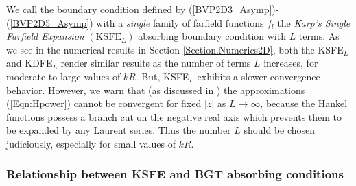 \documentclass[final,3p,times,12pt]{elsarticle}
\begin{document}
We call the boundary condition defined by (\ref{BVP2D3_Asymp})-(\ref{BVP2D5_Asymp}) with a \textit{single} family of farfield functions $f_{l}$ the \textit{Karp's Single Farfield Expansion} $(\text{KSFE}_{L})$ absorbing boundary condition with $L$ terms. As we see in the numerical results in Section \ref{Section.Numerics2D}, both the KSFE$_{L}$ and KDFE$_{L}$ render similar results  as the number of terms $L$ increases, for moderate to large values of $kR$. But, KSFE$_{L}$ exhibits a slower convergence behavior. However, we warn that (as discussed in \cite{Karp}) the approximations (\ref{Eqn:Hpower}) cannot be convergent for fixed $|z|$ as $L \to \infty$, because the Hankel functions possess a branch cut on the negative real axis which prevents them to be expanded by any Laurent series. Thus the number $L$ should be chosen judiciously, especially for small values of $kR$.


\subsubsection{Relationship between KSFE and BGT absorbing conditions}
\end{document}
